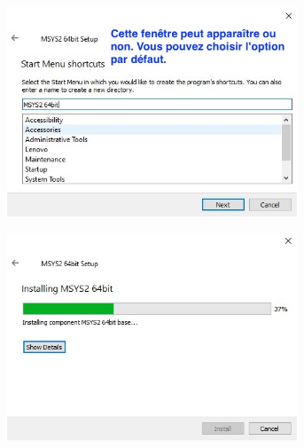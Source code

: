 \documentclass{article}
\begin{document}
\begin{figure}[H]
\begin{subfigure}[c]{0.5\textwidth}
\end{subfigure}
\begin{subfigure}[c]{0.5\textwidth}
\includegraphics[width=0.95\textwidth]{Plots/Msys2_3.jpeg}
\end{subfigure}
\begin{subfigure}[c]{0.5\textwidth}
\includegraphics[width=0.95\textwidth]{Plots/Msys2_4.jpeg}
\end{subfigure}
\begin{subfigure}[c]{0.5\textwidth}

\end{subfigure}
\end{figure}
\end{document}
